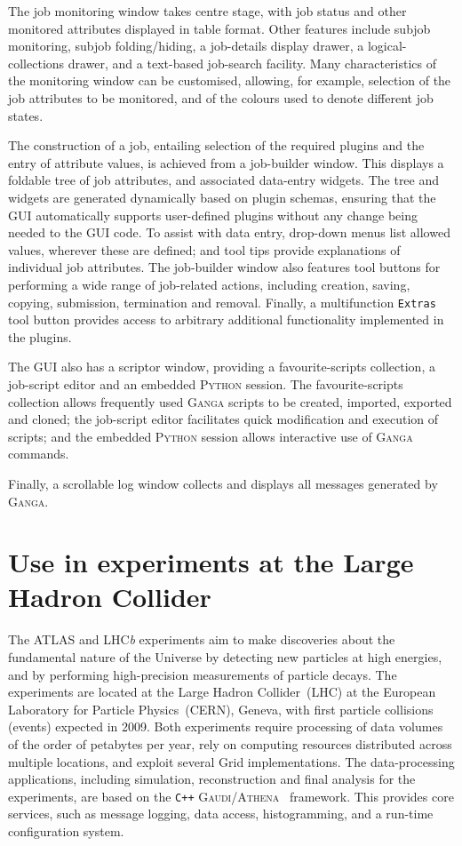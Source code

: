 \documentclass{elsart}
\def\lhcb {LHC{\em b\/}\xspace}
\def\atlas {ATLAS\xspace}
\def\lhc {LHC\xspace}
\def\ganga {\textsc{Ganga}\xspace}
\def\python {\textsc{Python}\xspace}
\def\gaudi {\textsc{Gaudi}\xspace}
\def\athena {\textsc{Athena}\xspace}
\def\grid {Grid\xspace}
\newcommand{\code}[1]{\texttt{#1}}
\begin{document}
\begin{linenumbers}
The job monitoring window takes centre stage,
with job status and other monitored attributes displayed
in table format. Other features include subjob monitoring, subjob  
folding/hiding, a job-details display drawer, a logical-collections  
drawer, and a text-based job-search facility. Many characteristics of the
monitoring window can be customised, allowing, for example, selection of
the job attributes to be monitored, and of the colours used to denote
different job states.

The construction of a job, entailing selection of the required plugins and  
the entry of attribute values, is achieved from a job-builder window. This
displays a foldable tree of job attributes, and associated data-entry
widgets. The tree and widgets are generated dynamically based
on plugin schemas, ensuring that the GUI automatically supports
user-defined plugins without any change being needed to the GUI code.  To
assist with data entry, drop-down menus list allowed values, wherever
these are defined; and tool tips provide explanations of individual job
attributes.  The job-builder window also features tool buttons for
performing a wide range of job-related actions, including
creation, saving, copying, submission, termination and removal.  Finally,
a multifunction \code{Extras} tool button provides access to arbitrary
additional functionality implemented in the plugins.

The GUI also has a scriptor window, providing a
favourite-scripts collection, a job-script editor and an embedded \python
session.  The favourite-scripts collection allows frequently used \ganga
scripts to be created, imported, exported and cloned; the job-script editor
facilitates quick modification and execution of scripts; and the
embedded \python session allows interactive use of \ganga commands.

Finally, a scrollable log window collects and displays all messages  
generated by \ganga.


\section{Use in experiments at the Large Hadron Collider}
\label{sec:useHEP}

The \atlas and \lhcb experiments aim to make discoveries about the
fundamental nature of the Universe by detecting new particles at 
high energies, and by performing high-precision measurements of
particle decays. The experiments
are located at the Large Hadron Collider~(\lhc) at the European Laboratory for
Particle Physics~(CERN), Geneva, with first particle collisions (events) expected in
2009. Both experiments require processing of data
volumes of the order of petabytes per year, rely on computing resources
distributed across multiple locations, and exploit several \grid implementations. The data-processing applications,
including simulation, reconstruction and final analysis for the experiments,
are based on the \code{C++} \gaudi/\athena~\cite{gaudi} framework.  This
provides core services, such as message logging, data access, histogramming,
and a run-time configuration system. 


\end{linenumbers}
\end{document}
